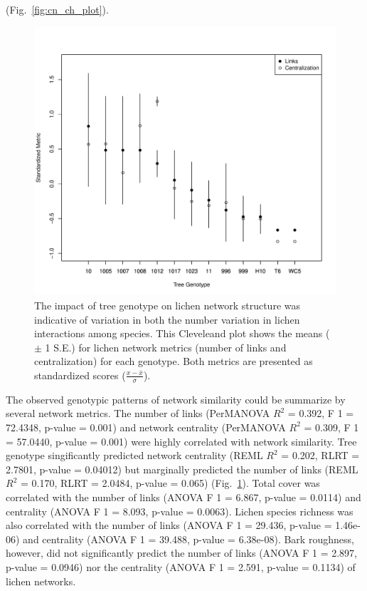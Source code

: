 \documentclass[9pt,twocolumn,twoside,lineno]{pnas-new}
\begin{document}
{(Fig.~\ref{fig:cn_ch_plot}). 



\begin{figure}[ht]
\centering
\includegraphics[width=\linewidth]{cn_metrics.pdf}
\caption{The impact of tree genotype on lichen network structure was
  indicative of variation in both the number variation in lichen
  interactions among species. This Cleveleand plot shows the means
  ($\pm$ 1 S.E.) for lichen network metrics (number of links and
  centralization) for each genotype. Both metrics are presented as
  standardized scores ($\frac{x - \bar{x}}{\sigma}$).}
\label{fig:cn_metrics}
\end{figure}


The observed genotypic patterns of network similarity could be
summarize by several network metrics. The number of links (PerMANOVA
$R^2$ = 0.392, F 1 = 72.4348, p-value = 0.001) and network centrality
(PerMANOVA $R^2$ = 0.309, F 1 = 57.0440, p-value = 0.001) were highly
correlated with network similarity.  Tree genotype singificantly
predicted network centrality (REML $R^2$ = 0.202, RLRT = 2.7801,
p-value = 0.04012) but marginally predicted the number of links (REML
$R^2$ = 0.170, RLRT = 2.0484, p-value = 0.065)
(Fig.~\ref{fig:cn_metrics}). Total cover was correlated with the
number of links (ANOVA F 1 = 6.867, p-value = 0.0114) and centrality
(ANOVA F 1 = 8.093, p-value = 0.0063). Lichen species richness was
also correlated with the number of links (ANOVA F 1 = 29.436, p-value
= 1.46e-06) and centrality (ANOVA F 1 = 39.488, p-value =
6.38e-08). Bark roughness, however, did not significantly predict the
number of links (ANOVA F 1 = 2.897, p-value = 0.0946) nor the
centrality (ANOVA F 1 = 2.591, p-value = 0.1134) of lichen networks.



}
\end{document}
